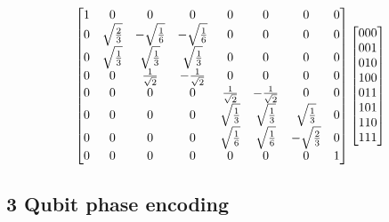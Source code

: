 \begin{align}
\begin{bmatrix}
1 &0 &0 &0 &0 &0 &0 &0 \\
0 &\sqrt{\frac{2}{3}} &-\sqrt{\frac{1}{6}} &-\sqrt{\frac{1}{6}} &0 &0 &0 &0\\
0 &\sqrt{\frac{1}{3}} &\sqrt{\frac{1}{3}} &\sqrt{\frac{1}{3}} &0 &0 &0 &0\\
0 &0 &\frac{1}{\sqrt{2}} &-\frac{1}{\sqrt{2}} &0 &0 &0 &0 \\
0 &0 &0 &0 &\frac{1}{\sqrt{2}} &-\frac{1}{\sqrt{2}} &0 &0 \\
0 &0 &0 &0 &\sqrt{\frac{1}{3}} &\sqrt{\frac{1}{3}} &\sqrt{\frac{1}{3}} &0 \\
0 &0 &0 &0 &\sqrt{\frac{1}{6}} &\sqrt{\frac{1}{6}} &-\sqrt{\frac{2}{3}} &0 \\
0 &0 &0 &0 &0 &0 &0 &1 \\
\end{bmatrix}
\begin{bmatrix}
000 \\
001 \\
010 \\
100 \\
011 \\
101 \\
110 \\
111 \\
\end{bmatrix}
\end{align}

\subsection{3 Qubit phase encoding}

